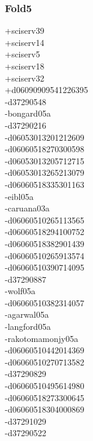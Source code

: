 \begin{multicols}{3}
\subsubsection*{Fold5}
+sciserv39\\
+sciserv14\\
+sciserv5\\
+sciserv18\\
+sciserv32\\
+d06090909541226395\\
-d37290548\\
-bongard05a\\
-d37290216\\
-d06053013201212609\\
-d06060518270300598\\
-d06053013205712715\\
-d06053013265213079\\
-d06060518335301163\\
-eibl05a\\
-caruana03a\\
-d06060510265113565\\
-d06060518294100752\\
-d06060518382901439\\
-d06060510265913574\\
-d06060510390714095\\
-d37290887\\
-wolf05a\\
-d06060510382314057\\
-agarwal05a\\
-langford05a\\
-rakotomamonjy05a\\
-d06060510442014369\\
-d06060510270713582\\
-d37290829\\
-d06060510495614980\\
-d06060518273300645\\
-d06060518304000869\\
-d37291029\\
-d37290522\\

\end{multicols}
